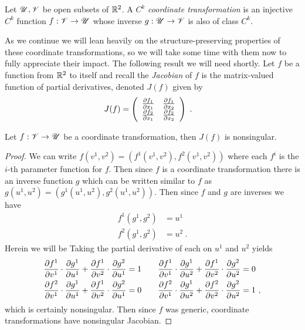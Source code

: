 \begin{defn} %
  Let $\mathscr{U}, \mathscr{V}$ be open subsets of $\mathbb{R}^2$. A $C^k$ \emph{coordinate transformation} is an injective $C^k$ function $f: \mathscr{V} \to \mathscr{U}$ whose inverse $g:\mathscr{U} \to \mathscr{V}$ is also of class $C^k$. 
\end{defn}


As we continue we will lean heavily on the structure-preserving properties of these coordinate transformations, so we will take some time with them now to fully appreciate their impact. The following result we will need shortly. Let $f$ be a function from $\mathbb{R}^2$ to itself and recall the \emph{Jacobian} of $f$ is the matrix-valued function of partial derivatives, denoted $J(f)$ given by
\begingroup
  \renewcommand*{\arraystretch}{1.4}
  \begin{align*}
    J(f) &= \left(
    \begin{array}{cc}
      \frac{\partial f_1}{\partial x_1} & \frac{\partial f_1}{\partial x_2}\\
      \frac{\partial f_2}{\partial x_1} & \frac{\partial f_2}{\partial x_2}
    \end{array}
    \right) \ .
  \end{align*}
\endgroup

\begin{lem}
  Let $f:\mathscr{V} \to \mathscr{U}$ be a coordinate transformation, then $J(f)$ is nonsingular.
\end{lem}

\begin{proof}
  We can write $f(v^1, v^2) = (f^1(v^1, v^2), f^2(v^1, v^2))$ where each $f^i$ is the $i$-th parameter function for $f$. Then since $f$ is a coordinate transformation there is an inverse function $g$ which can be written similar to $f$ as $g(u^1, u^2) = (g^1(u^1, u^2), g^2(u^1, u^2))$. Then since $f$ and $g$ are inverses we have
  \begin{align*}
    f^1(g^1, g^2) &= u^1\\
    f^2(g^1, g^2) &= u^2 \ .
  \end{align*}
  Herein we will be Taking the partial derivative of each on $u^1$ and $u^2$ yields
  \newcommand{\fdg}[3]{\frac{\del f^{#1}}{\del v^{#2}} \cdot \frac{\del g^{#2}}{\del u^{#3}}}
  \begin{equation*}
    \begin{aligned}[c]
      \fdg{1}{1}{1} + \fdg{1}{2}{1} &= 1\\
      \fdg{2}{1}{1} + \fdg{1}{2}{1} &= 0
    \end{aligned}\qquad
    \begin{aligned}[c]
      \fdg{1}{1}{2} + \fdg{1}{2}{2} &= 0\\
      \fdg{2}{1}{2} + \fdg{2}{2}{2} &= 1 \ ,
    \end{aligned}
  \end{equation*}
  which is certainly nonsingular. Then since $f$ was generic, coordinate transformations have nonsingular Jacobian.
\end{proof}

